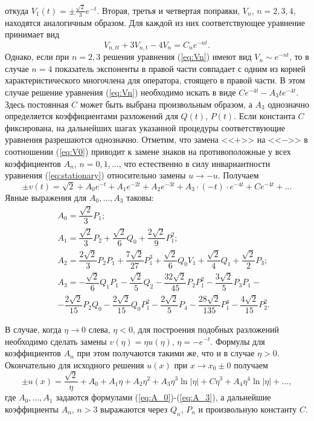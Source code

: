 %
откуда $V_1(t) = \pm \frac{\sqrt{2}}{3} e^{-t}$.
Вторая, третья и четвертая поправки, $V_n$, $n = 2,3,4$, находятся аналогичным образом.
Для каждой из них соответствующее уравнение принимает вид
%
\begin{equation}
V_{n,tt} + 3V_{n,t} - 4V_n = C_n e^{-nt}.
\label{eq:Vn}
\end{equation}
%
Однако, если при $n = 2,3$ решения уравнения (\ref{eq:Vn}) имеют вид $V_n \sim e^{-nt}$, то в случае $n = 4$ показатель экспоненты в правой части совпадает с одним из корней характеристического многочлена для оператора, стоящего в правой части.
В этом случае решение уравнения (\eqref{eq:Vn}) необходимо искать в виде $Ce^{-4t} - A_3 t e^{-4t}$.
Здесь постоянная $C$ может быть выбрана произвольным образом, а $A_3$ однозначно определяется коэффициентами разложений для $Q(t)$, $P(t)$.
Если константа $C$ фиксирована, на дальнейших шагах указанной процедуры соответствующие уравнения разрешаются однозначно.
Отметим, что замена <<$+$>> на <<$-$>> в соотношении (\ref{eq:V0}) приводит к замене знаков на противоположные у всех коэффициентов $A_n$, $n = 0, 1, \dots$, что естественно в силу инвариантности уравнения (\ref{eq:stationary}) относительно замены $u \to -u$.
Получаем
%
\begin{equation}
\pm v(t) = \sqrt{2} + A_0 e^{-t} + A_1 e^{-2t} + A_2 e^{-3t} + A_3 \cdot (-t) \cdot e^{-4t} + Ce^{-4t} + \dots
\end{equation}
%
Явные выражения для $A_0, \dots, A_3$ таковы:
%
\begin{eqnarray}
&& A_0 = \dfrac{\sqrt{2}}{3} P_1; \label{eq:A_0} \\
&& A_1 = \dfrac{\sqrt{2}}{3} P_2 + \dfrac{\sqrt{2}}{6} Q_0 + \dfrac{2\sqrt{2}}{9} P_1^2; \label{eq:A_1} \\
&& A_2 = \dfrac{2\sqrt{2}}{3} P_2 P_1 + \dfrac{7\sqrt{2}}{27} P_1^3 + \dfrac{\sqrt{2}}{6} Q_0 V_1 + \dfrac{\sqrt{2}}{4} Q_1 + \dfrac{\sqrt{2}}{2} P_3; \label{eq:A_2} \\
&& A_3 = -\dfrac{\sqrt{2}}{6} Q_1 P_1 - \dfrac{\sqrt{2}}{5} Q_2 - \dfrac{32 \sqrt{2}}{45} P_2 P_1^2 - \dfrac{3\sqrt{2}}{5} P_3 P_1 - \label{eq:A_3} \\ 
&& \nonumber - \dfrac{2\sqrt{2}}{15} P_2 Q_0 - \dfrac{2\sqrt{2}}{15} Q_0 P_1^2 - \dfrac{2\sqrt{2}}{5} P_4 - \dfrac{28\sqrt{2}}{135} P_1^4 - \dfrac{4\sqrt{2}}{15} P_2^2.
\end{eqnarray}
%

В случае, когда $\eta \to 0$ слева, $\eta < 0$, для построения подобных разложений необходимо сделать замены $v(\eta) = \eta u(\eta)$, $\eta = -e^{-t}$.
Формулы для коэффициентов $A_n$ при этом получаются такими же, что и в случае $\eta > 0$.
Окончательно для исходного решения $u(x)$ при $x \to x_0 \pm 0$ получаем
%
\begin{equation}
\pm u(x) = \dfrac{\sqrt{2}}{\eta} + A_0 + A_1 \eta + A_2 \eta^2 + A_3 \eta^3 \ln|\eta| + C\eta^3 + A_4\eta^4 \ln|\eta| + \dots,
\label{eq:final_asympt}
\end{equation}
%
где $A_0,\dots,A_1$ задаются формулами (\ref{eq:A_0})-(\ref{eq:A_3}), а дальнейшие коэффициенты $A_n$, $n > 3$ выражаются через $Q_n$, $P_n$ и произвольную константу $C$.

